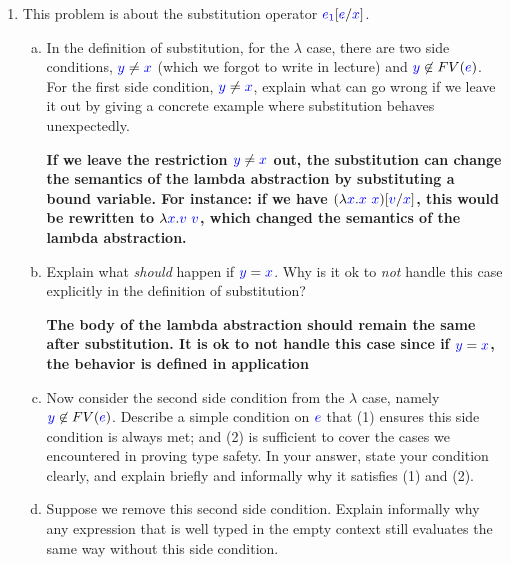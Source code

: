 \documentclass{article}
\newcommand{\meta}[1]{{\color{blue}#1}}
\begin{document}
\begin{enumerate}[leftmargin=*,itemindent=*,start=1,label={{\bf Problem \arabic*}.},ref=\arabic*]
\begin{enumerate}[(a)]
\begin{proof}
    \end{proof}
    This lemma is stronger. Having $\cdot\vdash\meta{e}:\meta{\tau}$ and assuming that $\meta{e}$ is not closed, then there exists a free variable $\meta{x}\in FV(\meta{e})$ such that $\cdot\vdash\meta{x}:\meta{\tau^\prime}$. However, $\cdot$ is an empty envrionment, so the domain of $\cdot$ is $\emptyset$, and no free variable can be assigned a type in this context. This contradicts with the conclusion of the lemma that $\exists \meta{\tau^\prime}, \cdot\vdash\meta{x}:\meta{\tau^\prime}$. So if $\cdot\vdash\meta{e}:\meta{\tau}$, $\meta{e}$ must be closed.

  \end{enumerate}
\item This problem is about the substitution operator $\meta{e_1}[\meta{e}/\meta{x}]$.
  \begin{enumerate}[(a)]
  \item In the definition of substitution, for the $\lambda$ case, there are two
    side conditions, $\meta{y}\ne\meta{x}$ (which we forgot to write in lecture)
    and $\meta{y}\not\in FV(\meta{e})$. For the first side condition, $\meta{y}\ne\meta{x}$,
    explain what can go wrong if we leave it out by giving a concrete example where
    substitution behaves unexpectedly.

    \textbf{If we leave the restriction $\meta{y} \neq \meta{x}$ out, the substitution can change the semantics of the lambda abstraction by substituting a bound variable. For instance: if we have $(\lambda \meta{x}. \meta{x}\ \meta{x})\lbrack \meta{v}/\meta{x}\rbrack$, this would be rewritten to $\lambda \meta{x}. \meta{v}\ \meta{v}$, which changed the semantics of the lambda abstraction.}

  \item Explain what \emph{should} happen if $\meta{y} = \meta{x}$. Why is it ok to \emph{not} handle this case explicitly in the definition of substitution?
    
    \textbf{The body of the lambda abstraction should remain the same after substitution. It is ok to not handle this case since if $\meta{y}=\meta{x}$, the behavior is defined in application}

  \item Now consider the second side condition from the $\lambda$ case, namely $\meta{y}\not\in FV(\meta{e})$.
    Describe a simple condition on $\meta{e}$ that (1) ensures this side condition is always met;
    and (2) is sufficient to cover the cases we encountered in proving type safety.
    In your answer, state your condition clearly, and explain briefly and informally why it satisfies (1) and (2).
  \item Suppose we remove this second side condition. Explain informally why any
    expression that is well typed in the empty context still evaluates the same
    way without this side condition.
    

\end{enumerate}
\end{enumerate}
\end{document}
